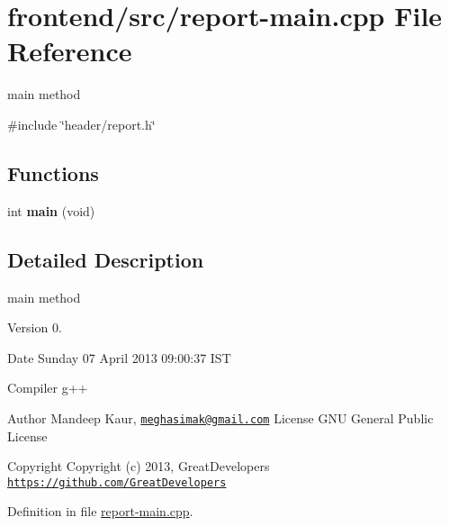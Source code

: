 \hypertarget{report-main_8cpp}{\section{frontend/src/report-\/main.cpp \-File \-Reference}
\label{report-main_8cpp}
}


main method  


{\ttfamily \#include \char`\"{}header/report.\-h\char`\"{}}\*
\subsection*{\-Functions}
\begin{DoxyCompactItemize}
\item 
\hypertarget{report-main_8cpp_a840291bc02cba5474a4cb46a9b9566fe}{int {\bfseries main} (void)}\label{report-main_8cpp_a840291bc02cba5474a4cb46a9b9566fe}

\end{DoxyCompactItemize}


\subsection{\-Detailed \-Description}
main method \begin{DoxyVersion}{\-Version}
0. 
\end{DoxyVersion}
\begin{DoxyDate}{\-Date}
\-Sunday 07 \-April 2013 09\-:00\-:37 \-I\-S\-T\par
 \-Compiler g++
\end{DoxyDate}
\begin{DoxyAuthor}{\-Author}
\-Mandeep \-Kaur, \href{mailto:meghasimak@gmail.com}{\tt meghasimak@gmail.\-com} \-License \-G\-N\-U \-General \-Public \-License 
\end{DoxyAuthor}
\begin{DoxyCopyright}{\-Copyright}
\-Copyright (c) 2013, \-Great\-Developers \href{https://github.com/GreatDevelopers}{\tt https\-://github.\-com/\-Great\-Developers} 
\end{DoxyCopyright}


\-Definition in file \hyperlink{report-main_8cpp_source}{report-\/main.\-cpp}.

